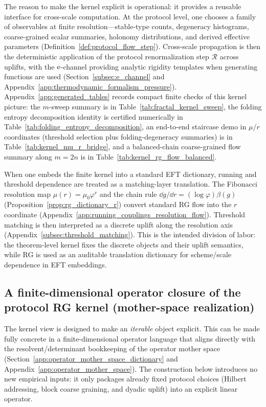 The reason to make the kernel explicit is operational: it provides a reusable interface for cross-scale computation.
At the protocol level, one chooses a family of observables at finite resolution---stable-type counts, degeneracy histograms, coarse-grained scalar summaries, holonomy distributions, and derived effective parameters (Definition~\ref{def:protocol_flow_step}).
Cross-scale propagation is then the deterministic application of the protocol renormalization step $\mathcal{R}$ across uplifts, with the $\mathrm{e}$-channel providing analytic rigidity templates when generating functions are used (Section~\ref{subsec:e_channel} and Appendix~\ref{app:thermodynamic_formalism_pressure}).
Appendix~\ref{app:generated_tables} records compact finite checks of this kernel picture: the $m$-sweep summary is in Table~\ref{tab:fractal_kernel_sweep}, the folding entropy decomposition identity is certified numerically in Table~\ref{tab:folding_entropy_decomposition}, an end-to-end staircase demo in $\mu/r$ coordinates (threshold selection plus folding-degeneracy summaries) is in Table~\ref{tab:kernel_mu_r_bridge}, and a balanced-chain coarse-grained flow summary along $m=2n$ is in Table~\ref{tab:kernel_rg_flow_balanced}.

When one embeds the finite kernel into a standard EFT dictionary, running and threshold dependence are treated as a matching-layer translation.
The Fibonacci resolution map $\mu(r)=\mu_0\varphi^r$ and the chain rule
$\dd g/\dd r=(\log\varphi)\beta(g)$ (Proposition~\ref{prop:rg_dictionary_r}) convert standard RG flow into the $r$ coordinate (Appendix~\ref{app:running_couplings_resolution_flow}).
Threshold matching is then interpreted as a discrete uplift along the resolution axis (Appendix~\ref{subsec:threshold_matching}).
This is the intended division of labor: the theorem-level kernel fixes the discrete objects and their uplift semantics, while RG is used as an auditable translation dictionary for scheme/scale dependence in EFT embeddings.

\subsection{A finite-dimensional operator closure of the protocol RG kernel (mother-space realization)}
\label{subsec:kernel_operator_closure}

The kernel view is designed to make an \emph{iterable} object explicit.
This can be made fully concrete in a finite-dimensional operator language that aligns directly with the resolvent/determinant bookkeeping of the operator mother space (Section~\ref{app:operator_mother_space_dictionary} and Appendix~\ref{app:operator_mother_space}).
The construction below introduces no new empirical inputs: it only packages already fixed protocol choices (Hilbert addressing, block coarse graining, and dyadic uplift) into an explicit linear operator.

